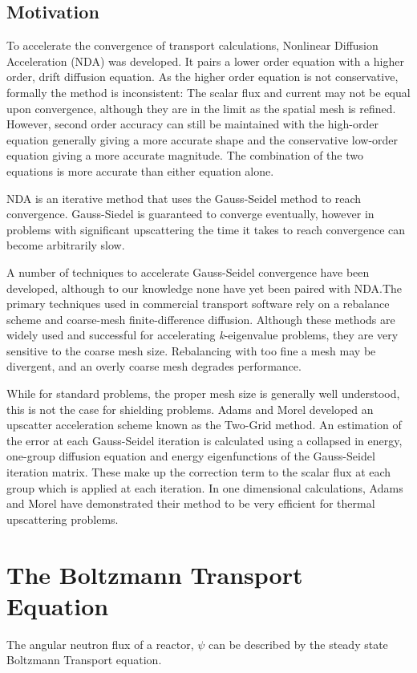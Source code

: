 \subsection{Motivation}
To accelerate the convergence of transport calculations, Nonlinear Diffusion Acceleration (NDA) was developed. It pairs a lower order equation with a higher order, drift diffusion equation. As the higher order equation is not conservative, formally the method is inconsistent: The scalar flux and current may not be equal upon convergence, although they are in the limit as the spatial mesh is refined. However, second order accuracy can still be maintained with the high-order equation generally giving a more accurate shape and the conservative low-order equation giving a more accurate magnitude. The combination of the two equations is more accurate than either equation alone. \cite{morel-holo} \par
NDA is an iterative method that uses the Gauss-Seidel method to reach convergence. Gauss-Siedel is guaranteed to converge eventually, however in problems with significant upscattering the time it takes to reach convergence can become arbitrarily slow. 
\par
A number of techniques to accelerate Gauss-Seidel convergence have been developed, although to our knowledge none have yet been paired with NDA.The primary techniques used in commercial transport software rely on a rebalance scheme and coarse-mesh finite-difference diffusion. Although these methods are widely used and successful for accelerating \textit{k}-eigenvalue problems, they are very sensitive to the coarse mesh size. Rebalancing with too fine a mesh may be divergent, and an overly coarse mesh degrades performance. \cite{evans-upscat}
\par
While for standard problems, the proper mesh size is generally well understood, this is not the case for shielding problems. Adams and Morel developed an upscatter acceleration scheme known as the Two-Grid method. An estimation of the error at each Gauss-Seidel iteration is calculated using a collapsed in energy, one-group diffusion equation and energy eigenfunctions of the Gauss-Seidel iteration matrix. These make up the correction term to the scalar flux at each group which is applied at each iteration. In one dimensional calculations, Adams and Morel have demonstrated their method to be very efficient for thermal upscattering problems. \cite{morel-upscat}

\section{The Boltzmann Transport Equation}
The angular neutron flux of a reactor, $\psi$ can be described by the steady state Boltzmann Transport equation.

